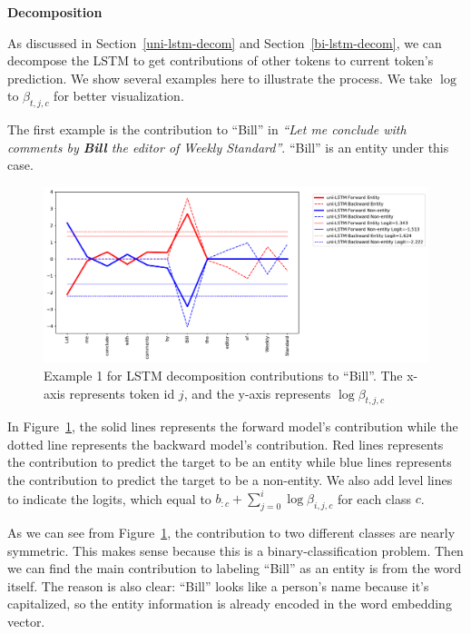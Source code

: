 \documentclass{article}
\begin{document}

\noindent \textbf{Decomposition}

As discussed in Section~\ref{uni-lstm-decom} and Section~\ref{bi-lstm-decom}, we can decompose the LSTM to get contributions of other tokens to current token's prediction. We show several examples here to illustrate the process. We take $\log$ to $\beta_{t,j,c}$ for better visualization.

The first example is the contribution to ``Bill'' in \textit{``Let me conclude with comments by \textbf{Bill} the editor of Weekly Standard''}. ``Bill'' is an entity under this case. 
\begin{figure}[t]
	\centering
	\includegraphics[width=\linewidth]{uni-Bill1.pdf}
	\caption{Example 1 for LSTM decomposition contributions to ``Bill''. The x-axis represents token id $j$, and the y-axis represents $\log \beta_{t, j, c}$}
	\label{fig:Bill}
\end{figure}

In Figure~\ref{fig:Bill}, the solid lines represents the forward model's contribution while the dotted line represents the backward model's contribution.  Red lines represents the contribution to predict the target to be an entity while blue lines represents the contribution to predict the target to be a non-entity. We also add level lines to indicate the logits, which equal to $b_{:c} + \sum_{j=0}^{i} \log \beta_{i, j, c} $ for each class $c$.

As we can see from Figure~\ref{fig:Bill}, the contribution to two different classes are nearly symmetric. This makes sense because this is a binary-classification problem. Then we can find the main contribution to labeling ``Bill'' as an entity is from the word itself. The reason is also clear: ``Bill'' looks like a person's name because it's capitalized, so the entity information is already encoded in the word embedding vector. 
\end{document}

